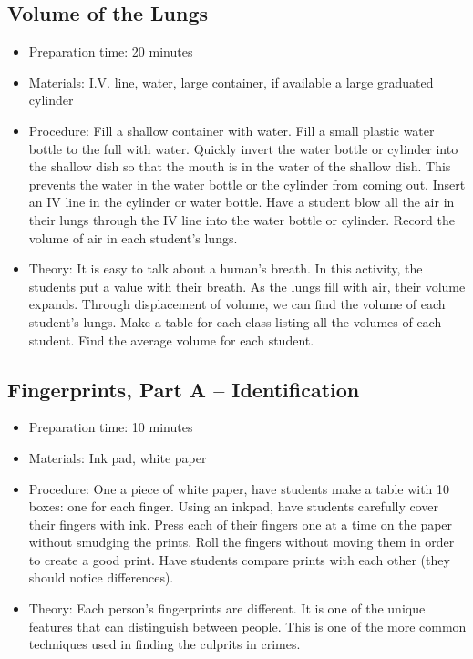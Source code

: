 \subsection{Volume of the Lungs}
\begin{itemize}
\item{Preparation time: 20 minutes}
\item{Materials: I.V. line, water, large container, if available a large graduated cylinder}
\item{Procedure: Fill a shallow container with water. Fill a small plastic water bottle to the full with water. Quickly invert the water bottle or cylinder into the shallow dish so that the mouth is in the water of the shallow dish. This prevents the water in the water bottle or the cylinder from coming out. Insert an IV line in the cylinder or water bottle. Have a student blow all the air in their lungs through the IV line into the water bottle or cylinder. Record the volume of air in each student’s lungs.}
\item{Theory: It is easy to talk about a human’s breath. In this activity, the students put a value with their breath. As the lungs fill with air, their volume expands. Through displacement of volume, we can find the volume of each student’s lungs. Make a table for each class listing all the volumes of each student. Find the average volume for each student.}
\end{itemize}

\subsection{Fingerprints, Part A – Identification}
\begin{itemize}
\item{Preparation time: 10 minutes}
\item{Materials: Ink pad, white paper }
\item{Procedure: One a piece of white paper, have students make a table with 10 boxes: one for each finger. Using an inkpad, have students carefully cover their fingers with ink. Press each of their fingers one at a time on the paper without smudging the prints. Roll the fingers without moving them in order to create a good print. Have students compare prints with each other (they should notice differences).}
\item{Theory: Each person’s fingerprints are different. It is one of the unique features that can distinguish between people. This is one of the more common techniques used in finding the culprits in crimes.}
\end{itemize}

